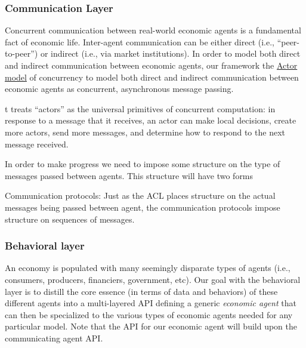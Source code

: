 \documentclass[11pt]{amsart}
\begin{document}
\subsubsection{Communication Layer}
Concurrent communication between real-world economic agents is a fundamental fact of economic life. Inter-agent communication can be either direct (i.e., ``peer-to-peer'') or indirect (i.e., via market institutions). In order to model both direct and indirect communication between economic agents, our framework  the \href{https://en.wikipedia.org/wiki/Actor_model}{Actor model} of concurrency to model both direct and indirect communication between economic agents as concurrent, asynchronous message passing.

t treats ``actors'' as the universal primitives of concurrent computation: in response to a message that it receives, an actor can make local decisions, create more actors, send more messages, and determine how to respond to the next message received.

In order to make progress we need to impose some structure on the type of messages passed between agents.  This structure will have two forms 


Communication protocols: Just as the ACL places structure on the actual messages being passed between agent, the communication protocols impose structure on sequences of messages.

\subsubsection{Behavioral layer}
An economy is populated with many seemingly disparate types of agents (i.e., consumers, producers, financiers, government, etc).  Our goal with the behavioral layer is to distill the core essence (in terms of data and behaviors) of these different agents into a multi-layered API defining a generic \textit{economic agent} that can then be specialized to the various types of economic agents needed for any particular model. Note that the API for our economic agent will build upon the communicating agent API.
\end{document}
